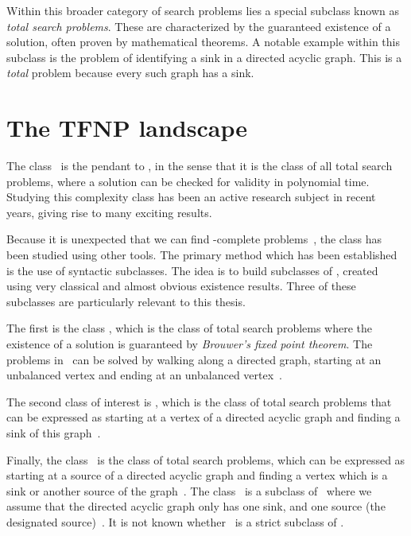Within this broader category of search problems lies a special subclass known as \emph{total search problems}. These are characterized by the guaranteed existence of a solution, often proven by mathematical theorems. A notable example within this subclass is the problem of identifying a sink in a directed acyclic graph. This is a \textit{total} problem because every such graph has a sink.

\section{The TFNP landscape}\label{sec:intro_tfnp_landscape}

The class \TFNP\ is the pendant to \NP, in the sense that it is the class of all total search problems, where a solution can be checked for validity in polynomial time. Studying this complexity class has been an active research subject in recent years, giving rise to many exciting results.

Because it is unexpected that we can find \TFNP-complete problems~, the class has been studied using other tools. The primary method which has been established is the use of syntactic subclasses. The idea is to build subclasses of \TFNP, created using very classical and almost obvious existence results. Three of these subclasses are particularly relevant to this thesis.

The first is the class \PPAD, which is the class of total search problems where the existence of a solution is guaranteed by \textit{Brouwer's fixed point theorem}. The problems in \PPAD\ can be solved by walking along a directed graph, starting at an unbalanced vertex and ending at an unbalanced vertex~.

The second class of interest is \PLS, which is the class of total search problems that can be expressed as starting at a vertex of a directed acyclic graph and finding a sink of this graph~.

Finally, the class \EOPL\ is the class of total search problems, which can be expressed as starting at a source of a directed acyclic graph and finding a vertex which is a sink or another source of the graph~. The class \UEOPL\ is a subclass of \EOPL\ where we assume that the directed acyclic graph only has one sink, and one source (the designated source)~. It is not known whether \UEOPL\ is a strict subclass of \EOPL\@.

